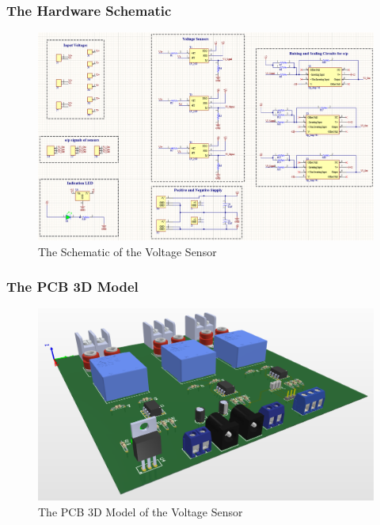 \documentclass[12pt,a4paper]{book}
\begin{document}
\subsubsection{The Hardware Schematic}
\begin{figure}[h!]
  \centering
  \includegraphics[width = 17cm]{image40.png}
  \caption{The Schematic of the Voltage Sensor}
  \label{fig:image40}
\end{figure}

\subsubsection{The PCB 3D Model}
\begin{figure}[h!]
  \centering
  \includegraphics[width = 15cm]{image41.png}
  \caption{The PCB 3D Model of the Voltage Sensor}
  \label{fig:image41}
\end{figure}
\end{document}
